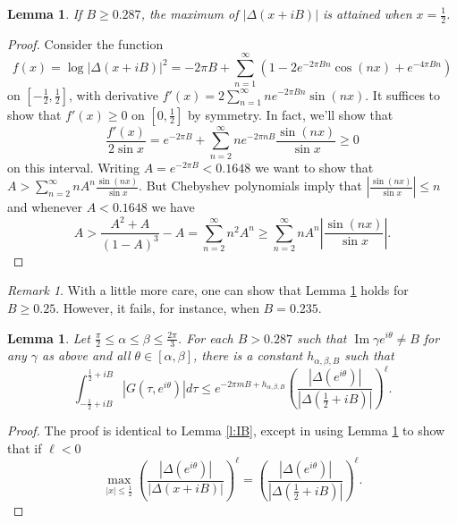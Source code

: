 \documentclass[12pt]{amsart}
\theoremstyle{plain} %
\newtheorem{lemma}      [theorem]{Lemma}
\theoremstyle{definition}
\theoremstyle{remark}
\newtheorem{remark}              {Remark}
\numberwithin{equation}{section}
\renewcommand{\Im}{\operatorname{Im}}
\begin{document}
\begin{lemma}\label{l:Deltamax}
If $B\geq 0.287$, the maximum of $|\Delta(x+iB)|$ is
  attained when $x=\frac{1}{2}$.
\end{lemma}
\begin{proof}
Consider the function
\[f(x)=\log |\Delta(x+iB)|^2=-2\pi B+\sum_{n=1}^\infty (1-2e^{-2\pi B n}\cos (nx)+e^{-4\pi B n})\]
on
$[-\frac{1}{2},\frac{1}{2}]$, with derivative $\displaystyle
f'(x)=2\sum_{n=1}^\infty ne^{-2\pi B n}\sin (nx)$. It suffices
to show that $f'(x)\geq 0$ on $[0,\frac{1}{2}]$ by symmetry. In
fact, we'll show that
\[\frac{f'(x)}{2\sin x}=e^{-2\pi B}+\sum_{n=2}^\infty ne^{-2\pi
  nB}\frac{\sin (nx)}{\sin x}\geq 0\]
on this interval. Writing $A=e^{-2\pi B}<0.1648$ we want to show
that $\displaystyle A>\sum_{n=2}^\infty nA^n\frac{\sin (nx)}{\sin x}$.
But Chebyshev polynomials imply that $|\frac{\sin (nx)}{\sin
  x}|\leq n$ and whenever $A<0.1648$ we have
\[A>\frac{A^2+A}{(1-A)^3}-A=\sum_{n=2}^\infty n^2A^n\geq \sum_{n=2}^\infty nA^n|\frac{\sin (nx)}{\sin x}|.\]
\end{proof}
\begin{remark}
With a little more care, one can show that Lemma \ref{l:Deltamax} holds for $B\geq 0.25$. However, it fails, for instance, when $B=0.235$.
\end{remark}


\begin{lemma}\label{l:IB-weak}
Let $\frac{\pi}{2}\leq \alpha\leq \beta \leq\frac{2\pi}{3}$. 
For each $B>0.287$ such that $\Im \gamma e^{i\theta}\neq B$ for any $\gamma$ as above and all $\theta\in [\alpha,\beta]$, there is a constant $h_{\alpha,\beta,B}$ such that
\[\int_{-\frac{1}{2}+iB}^{\frac{1}{2}+iB}|G(\tau,e^{i\theta})|d\tau\leq e^{-2\pi m B+h_{\alpha,\beta,B}}\left(\frac{|\Delta(e^{i\theta})|}{|\Delta(\frac{1}{2}+iB)|}\right)^\ell .\]
\end{lemma}
\begin{proof}
The proof is identical to Lemma \ref{l:IB}, except in using Lemma \ref{l:Deltamax} to show that if $\ell<0$ \[\displaystyle \max_{|x|\leq \frac{1}{2}}\left(\frac{|\Delta(e^{i\theta})|}{|\Delta(x+iB)|}\right)^\ell = \left(\frac{|\Delta(e^{i\theta})|}{|\Delta(\frac{1}{2}+iB)|}\right)^\ell.\] 
\end{proof}
\end{document}
